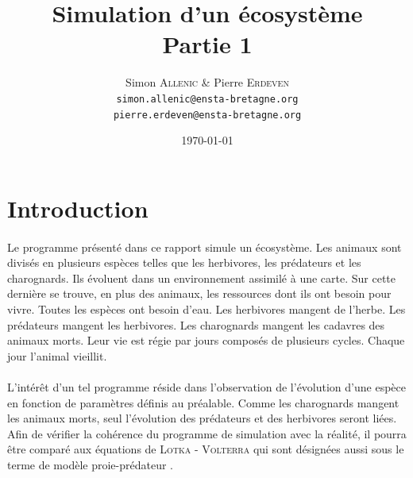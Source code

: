 \documentclass[a4paper,11pt,final,oneside]{article}
\title{Simulation d'un écosystème \\ Partie 1}
\author{Simon \textsc{Allenic} \& Pierre \textsc{Erdeven}\\
  \texttt{simon.allenic@ensta-bretagne.org} \\
  \texttt{pierre.erdeven@ensta-bretagne.org}}
\date{\today}
\begin{document}
\theoremstyle{plain}
\newtheorem{theo}{Théorème}
\newtheorem{mydef}{Définition}

\clearpage\maketitle
\thispagestyle{empty}
\newpage



\newpage

\tableofcontents
\newpage

	\section*{Introduction}

\paragraph{} Le programme présenté dans ce rapport simule un écosystème. Les animaux sont divisés en plusieurs espèces telles que les herbivores, les prédateurs et les charognards. Ils évoluent dans un environnement assimilé à une carte. Sur cette dernière se trouve, en plus des animaux, les ressources dont ils ont besoin pour vivre. Toutes les espèces ont besoin d'eau. Les herbivores mangent de l'herbe. Les prédateurs mangent les herbivores. Les charognards mangent les cadavres des animaux morts. Leur vie est régie par jours composés de plusieurs cycles. Chaque jour l'animal vieillit.

\paragraph{} L'intérêt d'un tel programme réside dans l'observation de l'évolution d'une espèce en fonction de paramètres définis au préalable. Comme les charognards mangent les animaux morts, seul l'évolution des prédateurs et des herbivores seront liées. Afin de vérifier la cohérence du programme de simulation avec la réalité, il pourra être comparé aux équations de \textsc{Lotka - Volterra} qui sont désignées aussi sous le terme de \og modèle proie-prédateur \fg.
\end{document}
